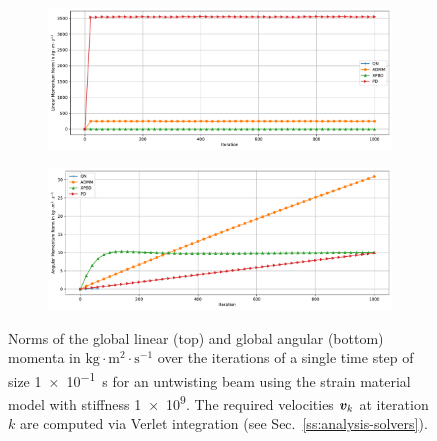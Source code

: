 \begin{figure}[h]
    \centering
    \begin{subfigure}{\textwidth}
        \includegraphics[width=\linewidth]{figures/strain_beam_untwist_momenta_large_ts.pdf}
    \end{subfigure}
    \begin{subfigure}{\textwidth}
        \includegraphics[width=\linewidth]{figures/strain_beam_untwist_angular_momenta_large_ts.pdf}
    \end{subfigure}
    \caption{Norms of the global linear (top) and global angular (bottom) momenta in $\text{kg}\cdot\text{m}^2\cdot\text{s}^{-1}$ over the iterations 
    of a single time step of size \SI{1e-1}{\second} for an untwisting beam using the strain material model with stiffness \num{1e9}. The required velocities 
    $\bm{v}_k$ at iteration $k$ are computed via Verlet integration (see Sec.\ \ref{ss:analysis-solvers}).
}
    \label{fig:strain-beam-untwist-momenta-large-ts}
\end{figure}

